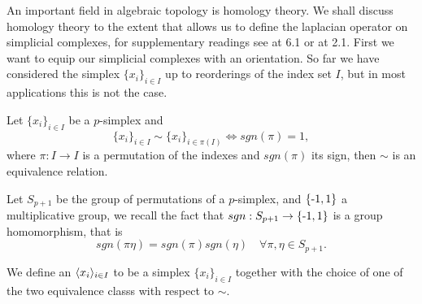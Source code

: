 \documentclass[../1.tex]{subfiles}
\begin{document}
    An important field in algebraic topology is homology theory. We shall discuss homology theory to the extent
    that allows us to define the laplacian operator on simplicial complexes, for supplementary readings see \cite{singerthorpe} at 6.1 or \cite{hatcher} at 2.1.
    First we want to equip our simplicial complexes with an orientation. So far we have considered the simplex $\{x_i\}_{i \in I}$ up to reorderings of the index set $I$, but in most applications this is not the case.

    \begin{prop}
        Let $\{x_i\}_{i \in I}$ be a $p$-simplex and
        \[ \{x_i\}_{i \in I} \sim \{x_i\}_{i \in \pi(I)} \iff sgn(\pi) = 1,\]
        where $\pi : I \to I$ is a permutation of the indexes and $sgn(\pi)$ its sign, then $\sim$
        is an equivalence relation.
    \end{prop}
    \begin{rem}
        Let $S_{p+1}$ be the group of permutations of a $p$-simplex, and $\{\text{-}1,1\}$ a multiplicative group,
        we recall the fact that $sgn: S_{p+1} \to \{\text{-}1,1\}$ is a group homomorphism, that is \[sgn(\pi\eta) = sgn(\pi)sgn(\eta) \quad \forall \pi,\eta \in S_{p+1}.\]
    \end{rem}
  
    \begin{defn}
        We define an  $\langle x_i \rangle_{i \in I}$ to be a simplex $\{x_i\}_{i \in I}$ together with the choice of
        one of the two equivalence classs with respect to $\sim$.
    \end{defn}
    
\end{document}
